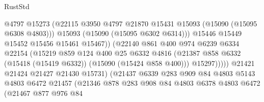 \begin{lexlean}{RustStd}
\begin{coremodule}
                                      @4797
                                      @15273
                                      (@22115
                                        @3950
                                        @4797
                                        @21870
                                        @15431
                                        @15093
                                        (@15090 (@15095 @6308 @4803)))
                                      @15093
                                      (@15090 (@15095 @6302 @6314)))
                                    @15446
                                    @15449
                                    @15452
                                    @15456
                                    @15461
                                    @15467))
                                (@22140
                                  @861
                                  @400
                                  @974
                                  @6239
                                  @6334
                                  @22154
                                  (@15219
                                    @859
                                    @124
                                    @400
                                    @25
                                    @6332
                                    @4816
                                    (@21387
                                      @858
                                      @6332
                                      (@15418 (@15419 @6332))
                                      (@15090 (@15424 @858 @400)))
                                    @15297)))))
                          @21421
                          @21424
                          @21427
                          @21430
                          @15731)
                        (@21437
                          @6339
                          @283
                          @909
                          @84
                          @4803
                          @5143
                          @4803
                          @6472
                          @21457
                          (@21346
                            @878
                            @283
                            @908
                            @84
                            @4803
                            @6378
                            @4803
                            @6472
                            (@21467
                              @877
                              @976
                              @84

\end{coremodule}
\end{lexlean}
